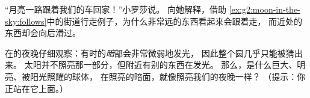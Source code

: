 \begin{exercise}[$\star\star$]\label{exo:g2:moon-in-the-sky:9}
“月亮一路跟着我们的车回家！”小罗莎说。
向她解释，借助
\cref{ex:g2:moon-in-the-sky:follows}中的街道行走例子，为什么非常远的东西看起来会跟着走，
而近处的东西却会向后滑过。
\end{exercise}

\begin{exercise}[$\star\star$]\label{exo:g2:moon-in-the-sky:10}
在的夜晚仔细观察：有时的\emph{暗}部会非常微弱地发光，
因此整个圆几乎只能被猜出来。
太阳并不照亮那一部分，但附近有别的东西在发光。
那么，是什么巨大、明亮、被阳光照耀的球体，
在照亮的暗面，就像照亮我们的夜晚一样？
（提示：你正站在它上面。）
\end{exercise}
